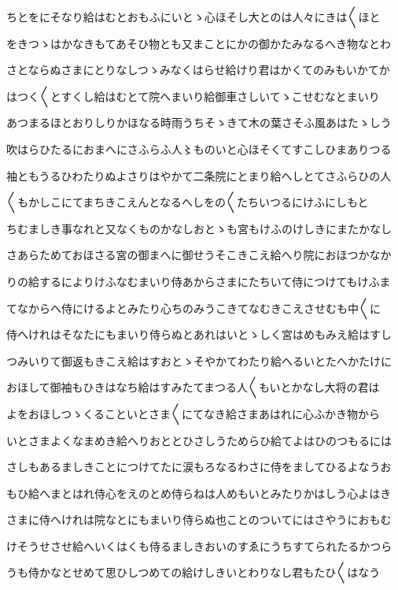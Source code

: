\documentclass[a4paper,11pt,landscape]{ltjtarticle}
\begin{document}
ちとをにそなり給はむとおもふにいとゝ心ほそし大とのは人々にきは〱ほと
\par\medskip
をきつゝはかなきもてあそひ物とも又まことにかの御かたみなるへき物なとわ
\par\medskip
さとならぬさまにとりなしつゝみなくはらせ給けり君はかくてのみもいかてか
\par\medskip
はつく〱とすくし給はむとて院へまいり給御車さしいてゝこせむなとまいり
\par\medskip
あつまるほとおりしりかほなる時雨うちそゝきて木の葉さそふ風あはたゝしう
\par\medskip
吹はらひたるにおまへにさふらふ人〻ものいと心ほそくてすこしひまありつる
\par\medskip
袖ともうるひわたりぬよさりはやかて二条院にとまり給へしとてさふらひの人
\par\medskip
〱もかしこにてまちきこえんとなるへしをの〱たちいつるにけふにしもと
\par\medskip
ちむましき事なれと又なくものかなしおとゝも宮もけふのけしきにまたかなし
\par\medskip
さあらためておほさる宮の御まへに御せうそこきこえ給へり院におほつかなか
\par\medskip
りの給するによりけふなむまいり侍あからさまにたちいて侍につけてもけふま
\par\medskip
てなからへ侍にけるよとみたり心ちのみうこきてなむきこえさせむも中〱に
\par\medskip
侍へけれはそなたにもまいり侍らぬとあれはいとゝしく宮はめもみえ給はすし
\par\medskip
つみいりて御返もきこえ給はすおとゝそやかてわたり給へるいとたへかたけに
\par\medskip
おほして御袖もひきはなち給はすみたてまつる人〱もいとかなし大将の君は
\par\medskip
よをおほしつゝくることいとさま〱にてなき給さまあはれに心ふかき物から
\par\medskip
いとさまよくなまめき給へりおととひさしうためらひ給てよはひのつもるには
\par\medskip
さしもあるましきことにつけてたに涙もろなるわさに侍をましてひるよなうお
\par\medskip
もひ給へまとはれ侍心をえのとめ侍らねは人めもいとみたりかはしう心よはき
\par\medskip
さまに侍へけれは院なとにもまいり侍らぬ也ことのついてにはさやうにおもむ
\par\medskip
けそうせさせ給へいくはくも侍るましきおいのすゑにうちすてられたるかつら
\par\medskip
うも侍かなとせめて思ひしつめての給けしきいとわりなし君もたひ〱はなう
\end{document}
